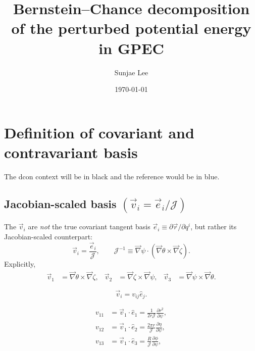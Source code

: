 \documentclass[10pt,a4paper]{article}
\title{Bernstein--Chance decomposition of the perturbed potential energy in GPEC}
\author{Sunjae Lee}
\date{\today}
\numberwithin{equation}{section}
\begin{document}
\maketitle


\section{Definition of covariant and contravariant basis}
The dcon context will be in black and \color{blue}the reference\cite{chance1992mhd} would be in blue. 
\color{black}\subsection{Jacobian-scaled basis $(\vec{v}_i = \vec{e}_i/\mathcal{J})$}

The $\vec{v}_i$ are \emph{not} the true covariant tangent basis $\vec{e}_i \equiv \partial\vec{r}/\partial q^i$, but rather its Jacobian-scaled counterpart:
\begin{equation}
    \vec{v}_i = \frac{\vec{e}_i}{\mathcal{J}}, \qquad
    \mathcal{J}^{-1} \equiv \vec{\nabla}\psi\cdot(\vec{\nabla}\theta\times\vec{\nabla}\zeta).
\end{equation}
Explicitly,
\begin{equation}
    \begin{aligned}
    \vec{v}_1 &= \vec{\nabla}\theta \times \vec{\nabla}\zeta, &
    \vec{v}_2 &= \vec{\nabla}\zeta \times \vec{\nabla}\psi, &
    \vec{v}_3 &= \vec{\nabla}\psi \times \vec{\nabla}\theta.
    \end{aligned}
\end{equation}

\begin{equation}
    \vec{v}_i = v_{ij}\hat{e}_j.
\end{equation}


\begin{equation}
\begin{aligned}
v_{11} &= \vec{v}_1 \cdot \hat{e}_1 = \frac{1}{2r\mathcal{J}}\frac{\partial r^2}{\partial \psi}, \\[6pt]
v_{12} &= \vec{v}_1 \cdot \hat{e}_2 = \frac{2\pi r}{\mathcal{J}}\frac{\partial \eta}{\partial \psi}, \\[6pt]
v_{13} &= \vec{v}_1 \cdot \hat{e}_3 = \frac{R}{\mathcal{J}}\frac{\partial \phi}{\partial \psi}, \\[6pt]
\end{aligned}
\end{equation}
\end{document}
